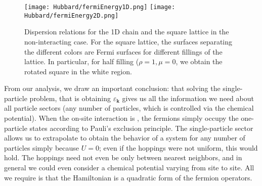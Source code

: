 \begin{figure}[H]
\texttt{[image: Hubbard/fermiEnergy1D.png]}
\hspace{-9mm}
\texttt{[image: Hubbard/fermiEnergy2D.png]}
	\caption[Dispersion relations for the \acs{1D} chain and the square lattice in the non-interacting case.]{Dispersion relations for the \acs{1D} chain and the square lattice in the non-interacting case.
	For the square lattice, the surfaces separating the different colors are Fermi surfaces for different fillings of the lattice. In particular, for half filling ($\rho = 1, \mu = 0$, we obtain the rotated square in the white region.}
	\label{fig:fermi1D}
\end{figure}

From our analysis, we draw an important conclusion: that solving the single-particle problem, that is obtaining $\varepsilon_{\bm k}$ gives us all the information we need about all particle sectors (any number of particles, which is controlled via the chemical potential).
When the on-site interaction is , the fermions simply occupy the one-particle states according to Pauli's exclusion principle.
The single-particle sector allows us to extrapolate to obtain the behavior of a system for any number of particles simply because $U = 0$; even if the hoppings were not uniform, this would hold.
The hoppings need not even be only between nearest neighbors, and in general we could even consider a chemical potential varying from site to site.
All we require is that the Hamiltonian is a quadratic form of the fermion operators.
